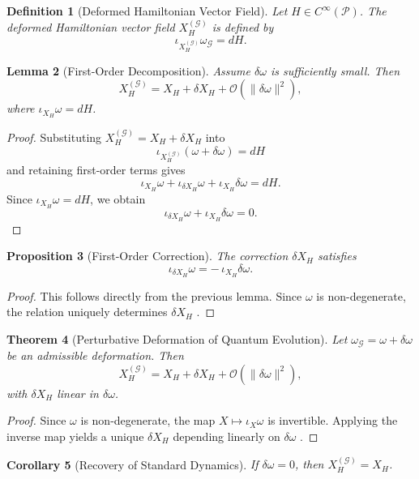 \documentclass[11pt, a4paper]{article}
\newtheorem{theorem}{Theorem}[section]
\newtheorem{lemma}[theorem]{Lemma}
\newtheorem{proposition}[theorem]{Proposition}
\newtheorem{definition}[theorem]{Definition}
\newtheorem{corollary}[theorem]{Corollary}
\begin{document}
\begin{definition}[Deformed Hamiltonian Vector Field]
Let $H \in C^\infty(\mathcal{P})$. The deformed Hamiltonian vector field
$X_H^{(\mathcal{G})}$ is defined by
\[
\iota_{X_H^{(\mathcal{G})}} \omega_{\mathcal{G}} = dH.
\]
\end{definition}

\begin{lemma}[First-Order Decomposition]
Assume $\delta\omega$ is sufficiently small. Then
\[
X_H^{(\mathcal{G})} = X_H + \delta X_H + \mathcal{O}(\|\delta\omega\|^2),
\]
where $\iota_{X_H}\omega = dH$.
\end{lemma}

\begin{proof}
Substituting $X_H^{(\mathcal{G})} = X_H + \delta X_H$ into
\[
\iota_{X_H^{(\mathcal{G})}}(\omega + \delta\omega) = dH
\]
and retaining first-order terms gives
\[
\iota_{X_H}\omega + \iota_{\delta X_H}\omega + \iota_{X_H}\delta\omega = dH.
\]
Since $\iota_{X_H}\omega = dH$, we obtain
\[
\iota_{\delta X_H}\omega + \iota_{X_H}\delta\omega = 0.
\]
\end{proof}

\begin{proposition}[First-Order Correction]
The correction $\delta X_H$ satisfies
\[
\iota_{\delta X_H}\omega = -\,\iota_{X_H}\delta\omega.
\]
\end{proposition}

\begin{proof}
This follows directly from the previous lemma. Since $\omega$ is
non-degenerate, the relation uniquely determines $\delta X_H$
\cite{abraham1978,arnold1989}.
\end{proof}

\begin{theorem}[Perturbative Deformation of Quantum Evolution]
Let $\omega_{\mathcal{G}} = \omega + \delta\omega$ be an admissible
deformation. Then
\[
X_H^{(\mathcal{G})} = X_H + \delta X_H + \mathcal{O}(\|\delta\omega\|^2),
\]
with $\delta X_H$ linear in $\delta\omega$.
\end{theorem}

\begin{proof}
Since $\omega$ is non-degenerate, the map $X \mapsto \iota_X \omega$
is invertible. Applying the inverse map yields a unique $\delta X_H$
depending linearly on $\delta\omega$ \cite{deGosson2011}.
\end{proof}

\begin{corollary}[Recovery of Standard Dynamics]
If $\delta\omega = 0$, then $X_H^{(\mathcal{G})} = X_H$.
\end{corollary}
\end{document}
